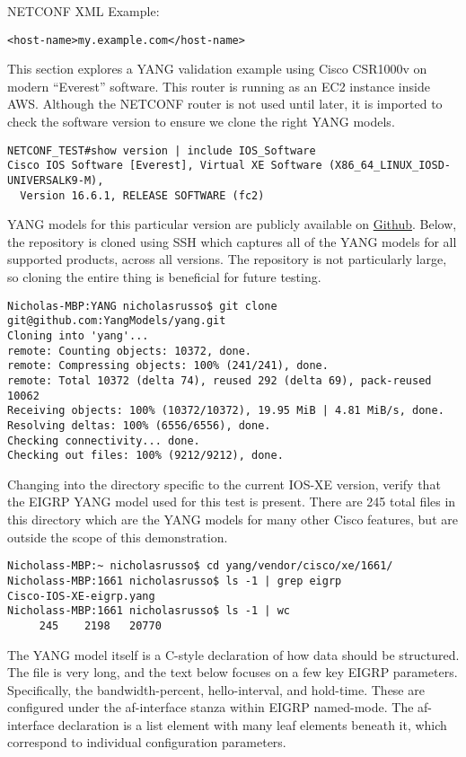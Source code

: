 NETCONF XML Example:
\begin{verbatim}
<host-name>my.example.com</host-name>
\end{verbatim}

This section explores a YANG validation example using Cisco CSR1000v on modern
``Everest'' software. This router is running as an EC2 instance inside AWS\@.
Although the NETCONF router is not used until later, it is imported to check
the software version to ensure we clone the right YANG models.

\begin{verbatim}
NETCONF_TEST#show version | include IOS_Software
Cisco IOS Software [Everest], Virtual XE Software (X86_64_LINUX_IOSD-UNIVERSALK9-M),
  Version 16.6.1, RELEASE SOFTWARE (fc2)
\end{verbatim}

YANG models for this particular version are publicly available on
\href{https://github.com/YangModels/yang/}{Github}. Below, the repository is
cloned using SSH which captures all of the YANG models for all supported
products, across all versions. The repository is not particularly large, so
cloning the entire thing is beneficial for future testing.

\begin{verbatim}
Nicholas-MBP:YANG nicholasrusso$ git clone git@github.com:YangModels/yang.git
Cloning into 'yang'...
remote: Counting objects: 10372, done.
remote: Compressing objects: 100% (241/241), done.
remote: Total 10372 (delta 74), reused 292 (delta 69), pack-reused 10062
Receiving objects: 100% (10372/10372), 19.95 MiB | 4.81 MiB/s, done.
Resolving deltas: 100% (6556/6556), done.
Checking connectivity... done.
Checking out files: 100% (9212/9212), done.
\end{verbatim}

Changing into the directory specific to the current IOS-XE version, verify
that the EIGRP YANG model used for this test is present. There are 245 total
files in this directory which are the YANG models for many other Cisco
features, but are outside the scope of this demonstration.

\begin{verbatim}
Nicholass-MBP:~ nicholasrusso$ cd yang/vendor/cisco/xe/1661/
Nicholass-MBP:1661 nicholasrusso$ ls -1 | grep eigrp
Cisco-IOS-XE-eigrp.yang
Nicholass-MBP:1661 nicholasrusso$ ls -1 | wc
     245    2198   20770
\end{verbatim}

The YANG model itself is a C-style declaration of how data should be
structured. The file is very long, and the text below focuses on a few key
EIGRP parameters. Specifically, the bandwidth-percent, hello-interval, and
hold-time. These are configured under the af-interface stanza within EIGRP
named-mode. The af-interface declaration is a list element with many leaf
elements beneath it, which correspond to individual configuration parameters.

